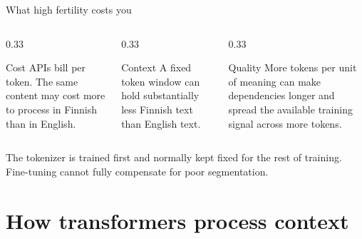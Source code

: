 \documentclass[aspectratio=169,10pt]{beamer}
\begin{document}
\begin{frame}{What high fertility costs you}
  \begin{columns}[T]
    \begin{column}{0.33\textwidth}
      \begin{block}{Cost}
        APIs bill per token. The same content may cost more to process in
        Finnish than in English.
      \end{block}
    \end{column}
    \begin{column}{0.33\textwidth}
      \begin{block}{Context}
        A fixed token window can hold substantially less Finnish text than
        English text.
      \end{block}
    \end{column}
    \begin{column}{0.33\textwidth}
      \begin{block}{Quality}
        More tokens per unit of meaning can make dependencies longer and
        spread the available training signal across more tokens.
      \end{block}
    \end{column}
  \end{columns}
  \vfill
  \begin{gotcha}
    The tokenizer is trained first and normally kept fixed for the rest of
    training. Fine-tuning cannot fully compensate for poor segmentation.
  \end{gotcha}
\end{frame}

\section{How transformers process context}
\end{document}
